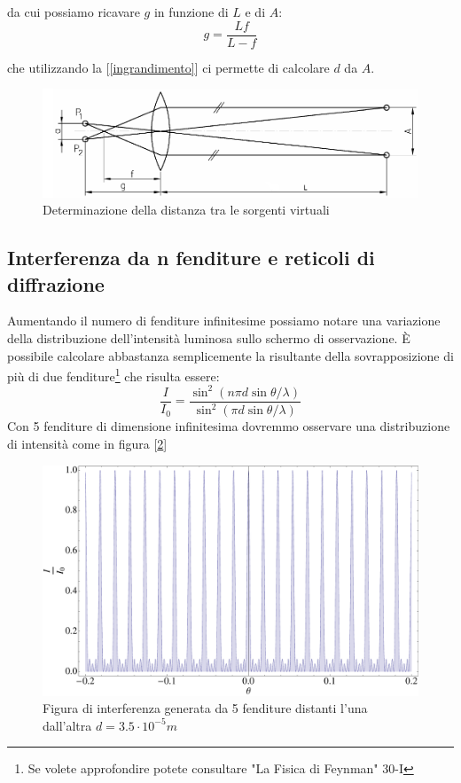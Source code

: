 \documentclass[a4paper,10pt,oneside]{article}
\begin{document}
da cui possiamo ricavare $g$ in funzione di $L$ e di $A$:
\begin{equation}
 g=\frac{Lf}{L-f}
\end{equation}

che utilizzando la [\ref{ingrandimento}] ci permette di calcolare $d$ da $A$.

\begin{figure}[H]
 \centering
 \includegraphics[width=\textwidth]{./Immagini/fresnel_mirrors.png}
 \caption{Determinazione della distanza tra le sorgenti virtuali}
 \label{fig:fresnel_2}
\end{figure}


\subsection{Interferenza da n fenditure e reticoli di diffrazione}

Aumentando il numero di fenditure infinitesime possiamo notare una variazione della distribuzione dell'intensità luminosa sullo schermo di osservazione. È possibile calcolare abbastanza semplicemente la risultante della sovrapposizione di più di due fenditure\footnote{Se volete approfondire potete consultare "La Fisica di Feynman" 30-I} che risulta essere:
\begin{equation}
 \frac{I}{I_0}=\frac{\sin^2(n \pi d \sin \theta/\lambda)}{\sin^2(\pi d \sin \theta/\lambda)}
\end{equation}
Con 5 fenditure di dimensione infinitesima dovremmo osservare una distribuzione di intensità come in figura [\ref{fig:reticolo1}]
\begin{figure}[H]
 \centering
 \includegraphics[width=\textwidth]{./Immagini/reticolo1.pdf}
 \caption{Figura di interferenza generata da 5 fenditure distanti l'una dall'altra $d=3.5\cdot 10^{-5}m$}
 \label{fig:reticolo1}
\end{figure}
\end{document}
